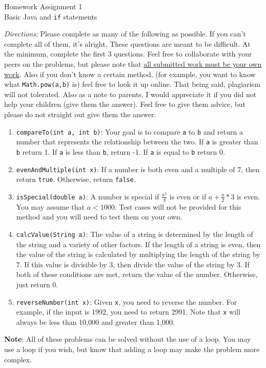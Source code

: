 \documentclass[11pt,fleqn]{article}
\theoremstyle{definition}
\begin{document}
\begin{center}
{\Huge
Homework Assignment 1
}\\
Basic Java and \texttt{if} statements
\end{center}

\textit{Directions}: Please complete as many of the following as possible. If
you can't complete all of them, it's alright. These questions are meant to
be difficult. At the minimum, complete the first 3 questions. Feel free to
collaborate with your peers on the problems, but please note that \underline{all
submitted work must be your own work}. Also if you don't know a certain method,
(for example, you want to know what \texttt{Math.pow(a,b)} is) feel free to look it
up online. That being said, plagiarism will not tolerated. Also as a note to
parents, I would appreciate it if you did not help your children (give them the
answer). Feel free to give them advice, but please do not straight out give them
the answer.    

\begin{enumerate}[Q1.]

\item
\texttt{compareTo(int a, int b)}: Your goal is to compare \texttt{a} to
\texttt{b} and return a number that represents the relationship between the
two. If \texttt{a} is greater than \texttt{b} return 1. If \texttt{a} is less
than \texttt{b}, return -1. If \texttt{a} is equal to \texttt{b} return 0. 

\item
\texttt{evenAndMultiple(int x)}: If a number is both even and a multiple of 7, then
return \texttt{true}. Otherwise, return \texttt{false}.

\item
\texttt{isSpecial(double a)}: A number is special if $\frac{a^2}{3}$ is even or if
$a + \frac{a}{2} * 3$ is even. You may assume that $a<1000$. Test cases will not
be provided for this method and you will need to test them on your own. 

\item
\texttt{calcValue(String a)}: The value of a string is determined by the length
of the string and a variety of other factors. If the length of a string is even,
then the value of the string is calculated by multiplying the length of the
string by 7. If this value is divisible by 3, then divide the value of the
string by 3. If both of these conditions are met, return the value of the
number. Otherwise, just return 0.  

\item
\texttt{reverseNumber(int x)}: Given \texttt{x}, you need to reverse the number.
For example, if the input is 1992, you need to return 2991. Note that \texttt{x}
will always be less than 10,000 and greater than 1,000. 

\end{enumerate}

\textbf{Note}: All of these problems can be solved without the use of a loop.
You may use a loop if you wish, but know that adding a loop may make the problem
more complex. 
\end{document}
